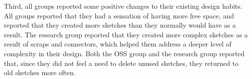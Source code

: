
Third, all groups reported some positive changes to their existing design habits. All groups reported that they had a sensation of having more free space, and reported that they created more sketches than they normally would have as a result. The research group reported that they created more complex sketches as a result of scraps and connectors, which helped them address a deeper level of complexity in their design. Both the OSS group and the research group reported that, since they did not feel a need to delete unused sketches, they returned to old sketches more often.



%

